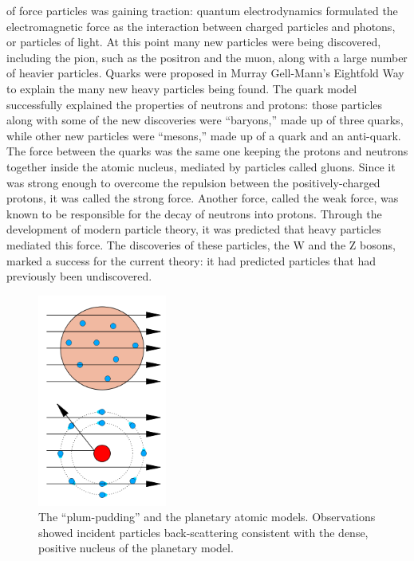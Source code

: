 of force particles was gaining traction: 
quantum electrodynamics formulated the electromagnetic force 
as the interaction between charged particles and photons, 
or particles of light.  
At this point many new particles were being discovered, 
including the pion, 
such 
as the positron and the muon, 
along with a large number of heavier particles.  
Quarks were proposed in Murray Gell-Mann's Eightfold Way 
to explain the many new heavy particles 
being found. %
The quark model successfully explained the 
properties of neutrons and protons: 
those particles along with some of the new discoveries 
were ``baryons,'' made up of three quarks, 
while other new particles were ``mesons,'' 
made up of a quark and an anti-quark.  
The force between the quarks was the same one 
keeping the protons and neutrons together inside the 
atomic nucleus, 
mediated by particles called gluons.  
Since it was strong enough to overcome the repulsion 
between the positively-charged protons, 
it was called the strong force.  
Another force, called the weak force, 
was known to be responsible for the decay of 
neutrons into protons.  
Through the development of modern particle theory, 
it was predicted that heavy particles mediated this force.  
The discoveries of these particles, the W and the Z bosons, 
marked a success for the current theory: 
it had predicted particles that had previously been 
undiscovered.  

 \begin{figure}[htb]
  \begin{center}
    \includegraphics[width=120pt]{Figures/overview-220px-Gold_foil_experiment_conclusions_svg-opaque.png}
  \end{center}
  \caption[\fixspacing The ``plum-pudding'' and the planetary atomic models. ]
	  {\fixspacing The ``plum-pudding'' and the planetary atomic models. 
	    Observations showed incident particles back-scattering 
	    consistent with the dense, positive nucleus of 
	    the planetary model. 
	  }
  \label{fig:AtomicModels}
 \end{figure}




